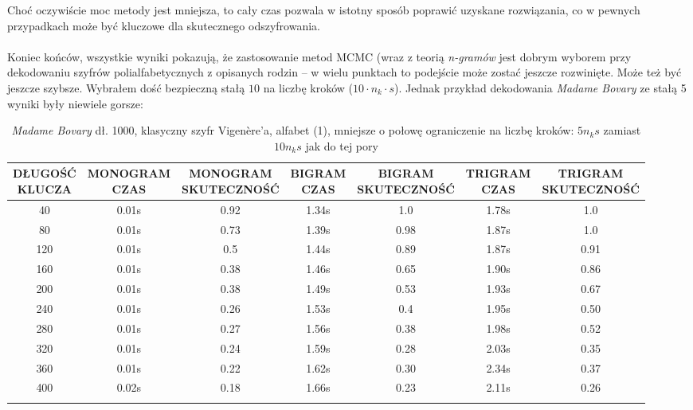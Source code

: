 \documentclass[a4paper]{article}
\theoremstyle{defn}
\theoremstyle{theorem}
\theoremstyle{lemma}
\theoremstyle{cor}
\theoremstyle{fact}
\begin{document}
Choć oczywiście moc metody jest mniejsza, to cały czas pozwala w istotny sposób poprawić uzyskane rozwiązania, co w pewnych przypadkach może być kluczowe dla skutecznego odszyfrowania.\\\\
Koniec końców, wszystkie wyniki pokazują, że zastosowanie metod MCMC (wraz z teorią \textit{n-gramów} jest dobrym wyborem przy dekodowaniu szyfrów polialfabetycznych z opisanych rodzin – w wielu punktach to podejście może zostać jeszcze rozwinięte. Może też być jeszcze szybsze. Wybrałem dość bezpieczną stałą $10$ na liczbę kroków ($10 \cdot n_k \cdot s$). Jednak przykład dekodowania \textit{Madame Bovary} ze stałą 5 wyniki były niewiele gorsze:
\begin{center}\begin{small}\begin{longtable}{|c|c|c|c|c|c|c|}
\hline \makecell{DŁUGOŚĆ\\KLUCZA} &  \makecell{MONOGRAM\\CZAS} & \makecell{MONOGRAM\\SKUTECZNOŚĆ} & \makecell{BIGRAM\\CZAS} &  \makecell{BIGRAM\\SKUTECZNOŚĆ} & \makecell{TRIGRAM\\CZAS} & \makecell{TRIGRAM\\SKUTECZNOŚĆ}\\ \hline
40 & 0.01s & 0.92 & 1.34s & 1.0 & 1.78s & 1.0 \\ \hline
80 & 0.01s & 0.73 & 1.39s & 0.98 & 1.87s & 1.0 \\ \hline
120 & 0.01s & 0.5 & 1.44s & 0.89 & 1.87s & 0.91 \\ \hline
160 & 0.01s & 0.38 & 1.46s & 0.65 & 1.90s & 0.86 \\ \hline
200 & 0.01s & 0.38 & 1.49s & 0.53 & 1.93s & 0.67 \\ \hline
240 & 0.01s & 0.26 & 1.53s & 0.4 & 1.95s & 0.50 \\ \hline
280 & 0.01s & 0.27 & 1.56s & 0.38 & 1.98s & 0.52 \\ \hline
320 & 0.01s & 0.24 & 1.59s & 0.28 & 2.03s & 0.35 \\ \hline
360 & 0.01s & 0.22 & 1.62s & 0.30 & 2.34s & 0.37 \\ \hline
400 & 0.02s & 0.18 & 1.66s & 0.23 & 2.11s & 0.26 \\ \hline
\caption{\textit{Madame Bovary} dł. 1000, klasyczny szyfr Vigenère'a, alfabet (1), mniejsze o połowę ograniczenie na liczbę kroków: $5n_k s$ zamiast $10 n_k s$ jak do tej pory}
\end{longtable}\end{small}\end{center}
\end{document}
